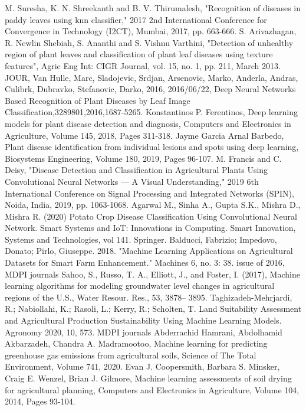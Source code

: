 \documentclass[12pt]{article}
\begin{document}
\begin{thebibliography}{9}
	M. Suresha, K. N. Shreekanth and B. V. Thirumalesh, "Recognition of diseases in paddy leaves using knn classifier," 2017 2nd International Conference for Convergence in Technology (I2CT), Mumbai, 2017, pp. 663-666.
	S. Arivazhagan, R. Newlin Shebiah, S. Ananthi and S. Vishnu Varthini, "Detection of unhealthy region of plant leaves and classification of plant leaf diseases using texture features", Agric Eng Int: CIGR Journal, vol. 15, no. 1, pp. 211, March 2013.
	JOUR, Van Hulle, Marc, Sladojevic, Srdjan, Arsenovic, Marko, Anderla, Andras, Culibrk, Dubravko, Stefanovic, Darko, 2016, 2016/06/22, Deep Neural Networks Based Recognition of Plant Diseases by Leaf Image Classification,3289801,2016,1687-5265.
	Konstantinos P. Ferentinos, Deep learning models for plant disease detection and diagnosis, Computers and Electronics in Agriculture, Volume 145, 2018, Pages 311-318.
	Jayme Garcia Arnal Barbedo, Plant disease identification from individual lesions and spots using deep learning, Biosystems Engineering, Volume 180, 2019, Pages 96-107.
	 M. Francis and C. Deisy, "Disease Detection and Classification in Agricultural Plants Using Convolutional Neural Networks — A Visual Understanding," 2019 6th International Conference on Signal Processing and Integrated Networks (SPIN), Noida, India, 2019, pp. 1063-1068.
	Agarwal M., Sinha A., Gupta S.K., Mishra D., Mishra R. (2020) Potato Crop Disease Classification Using Convolutional Neural Network. Smart Systems and IoT: Innovations in Computing. Smart Innovation, Systems and Technologies, vol 141. Springer.
	Balducci, Fabrizio; Impedovo, Donato; Pirlo, Giuseppe. 2018. "Machine Learning Applications on Agricultural Datasets for Smart Farm Enhancement." Machines 6, no. 3: 38. issue of 2016, MDPI journals
	Sahoo, S., Russo, T. A., Elliott, J., and Foster, I. (2017), Machine learning algorithms for modeling groundwater level changes in agricultural regions of the U.S., Water Resour. Res., 53, 3878– 3895.
	 Taghizadeh-Mehrjardi, R.; Nabiollahi, K.; Rasoli, L.; Kerry, R.; Scholten, T. Land Suitability Assessment and Agricultural Production Sustainability Using Machine Learning Models. Agronomy 2020, 10, 573. MDPI journals
	Abderrachid Hamrani, Abdolhamid Akbarzadeh, Chandra A. Madramootoo, Machine learning for predicting greenhouse gas emissions from agricultural soils, Science of The Total Environment, Volume 741, 2020.
	Evan J. Coopersmith, Barbara S. Minsker, Craig E. Wenzel, Brian J. Gilmore, Machine learning assessments of soil drying for agricultural planning, Computers and Electronics in Agriculture, Volume 104, 2014, Pages 93-104.

\end{thebibliography}
\end{document}
